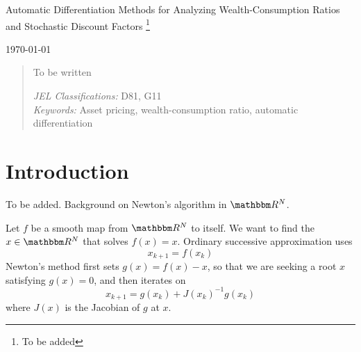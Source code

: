 \documentclass[12pt, reqno]{amsart}
\newcommand\blfootnote[1]{%
  \begingroup
  \renewcommand\thefootnote{}\footnote{#1}%
  \addtocounter{footnote}{-1}%
  \endgroup
}
\newcommand{\1}{\mathbbm 1}
\newcommand{\RR}{\mathbbm R}
\theoremstyle{plain}
\theoremstyle{definition}
\begin{document}
\title{}




\begin{center}
    \LARGE 
    Automatic Differentiation Methods for Analyzing Wealth-Consumption Ratios
    and Stochastic Discount Factors\blfootnote{To be added}
 
    \vspace{1em}



    \normalsize
    \today
\end{center}


\begin{abstract}
    To be written
    \vspace{1em}

    \noindent
    \textit{JEL Classifications:} D81, G11 \\
    \textit{Keywords:} Asset pricing, wealth-consumption ratio, automatic differentiation
\end{abstract}





\maketitle


\section{Introduction}

To be added.  Background on Newton's algorithm in $\RR^N$.

Let $f$ be a smooth map from $\RR^N$ to itself.  We want to find the $x \in
\RR^N$ that solves $f(x)=x$.  Ordinary successive approximation uses
%
\begin{equation}
    x_{k+1} = f(x_k)
\end{equation}
%
Newton's method first sets $g(x) = f(x) -x$, so that we are seeking a root $x$
satisfying $g(x)=0$, and then iterates on
%
\begin{equation}
    x_{k+1} = g(x_k) + J(x_k)^{-1} g(x_k)
\end{equation}
%
where $J(x)$ is the Jacobian of $g$ at $x$.
\end{document}
